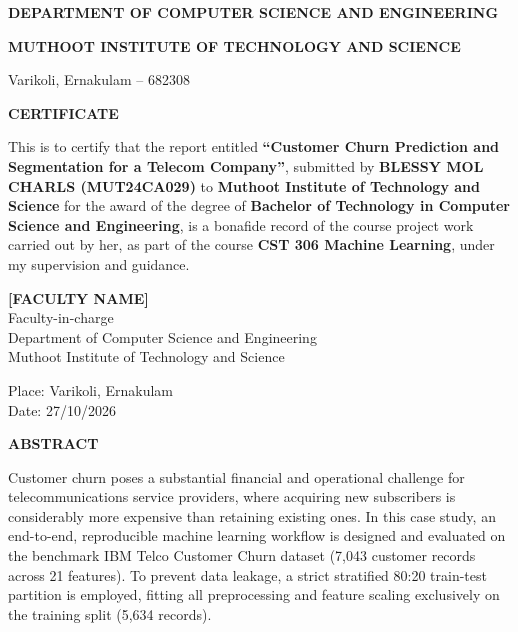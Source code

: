 \documentclass[12pt,a4paper]{report}
\newcommand{\datasetTotalRows}{7,043}
\newcommand{\datasetTotalCols}{21}
\newcommand{\datasetTrainCount}{5,634}
\begin{document}
\newpage
\thispagestyle{empty}
\begin{center}
    {\bfseries\LARGE DEPARTMENT OF COMPUTER SCIENCE AND ENGINEERING\par}
    {\bfseries\large MUTHOOT INSTITUTE OF TECHNOLOGY AND SCIENCE\par}
    {\large Varikoli, Ernakulam -- 682308\par}
    \vspace{1.0cm}
    {\bfseries\Large CERTIFICATE\par}
\end{center}

\vspace{0.8cm}
\noindent This is to certify that the report entitled \textbf{``Customer Churn Prediction and Segmentation for a Telecom Company''}, submitted by \textbf{BLESSY MOL CHARLS (MUT24CA029)} to \textbf{Muthoot Institute of Technology and Science} for the award of the degree of \textbf{Bachelor of Technology in Computer Science and Engineering}, is a bonafide record of the course project work carried out by her, as part of the course \textbf{CST 306 Machine Learning}, under my supervision and guidance.

\vspace{3.5cm}
\begin{flushright}
    \textbf{[FACULTY NAME]}\\[0.15cm]
    Faculty-in-charge\\
    Department of Computer Science and Engineering\\
    Muthoot Institute of Technology and Science
\end{flushright}

\vspace{2.0cm}
\noindent Place: Varikoli, Ernakulam\\
Date: 27/10/2026

\newpage
{}
\setcounter{page}{2}

\begin{center}
    {\bfseries\Large ABSTRACT\par}
\end{center}
\vspace{0.2cm}

\noindent Customer churn poses a substantial financial and operational challenge for telecommunications service providers, where acquiring new subscribers is considerably more expensive than retaining existing ones. In this case study, an end-to-end, reproducible machine learning workflow is designed and evaluated on the benchmark IBM Telco Customer Churn dataset (\datasetTotalRows{} customer records across \datasetTotalCols{} features). To prevent data leakage, a strict stratified 80:20 train-test partition is employed, fitting all preprocessing and feature scaling exclusively on the training split (\datasetTrainCount{} records). 
\end{document}
